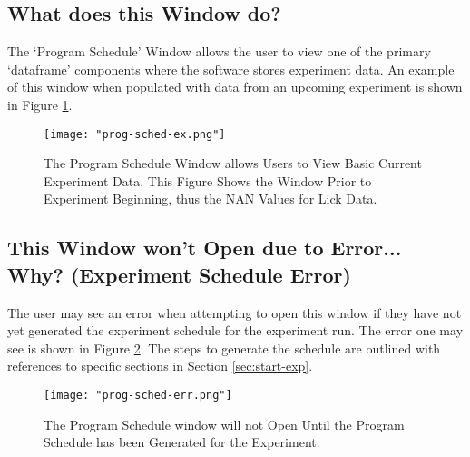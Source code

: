 \documentclass{article}
\begin{document}
\subsection{What does this Window do?}
The `Program Schedule' Window allows the user to view one of the primary `dataframe' components where the software stores experiment data. An example of this window 
when populated with data from an upcoming experiment is shown in Figure \ref{fig:prog-sched-ex}.

\begin{figure}[h!]
    \centering
    \texttt{[image: "prog-sched-ex.png"]}
    \caption{The Program Schedule Window allows Users to View Basic Current Experiment Data. This Figure Shows the Window Prior to Experiment Beginning, thus the NAN Values
    for Lick Data.}
    \label{fig:prog-sched-ex}
\end{figure}
\FloatBarrier

\clearpage
\subsection{This Window won't Open due to Error... Why? (Experiment Schedule Error)}
The user may see an error when attempting to open this window if they have not yet generated the experiment schedule for the experiment run. The error one may see is shown in
Figure \ref{fig:prog-sched-err}. The steps to generate the schedule are outlined with references to specific sections in Section \ref{sec:start-exp}.

\begin{figure}[h!]
    \centering
    \texttt{[image: "prog-sched-err.png"]}
    \caption{The Program Schedule window will not Open Until the Program Schedule has been Generated for the Experiment.}
    \label{fig:prog-sched-err}
\end{figure}
\FloatBarrier
\end{document}
